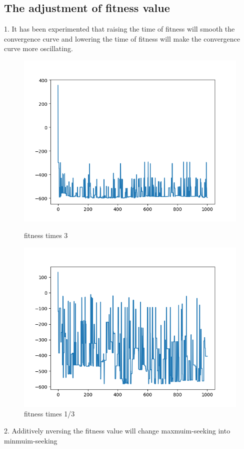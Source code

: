 \documentclass[11pt]{article} %
\begin{document}
\subsection{The adjustment of fitness value}
1. It has been experimented that raising the time of fitness will smooth the convergence curve and lowering the time of fitness will make the convergence curve more oscillating.
\begin{figure}[htbp]
\centering
\begin{minipage}[t]{0.4\textwidth}
\includegraphics[scale=0.4]{3.png}
\caption{fitness times 3}
\end{minipage}
\begin{minipage}[t]{0.4\textwidth}
\includegraphics[scale=0.4]{1_3.png}
\caption{fitness times 1/3}
\end{minipage}
\end{figure}
2. Additively nversing the fitness value will change maxmuim-seeking into minmuim-seeking
\end{document}
